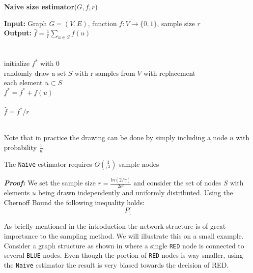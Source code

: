 \begin{algorithm*}[!htb]
  \caption{\small {\bf Naive size estimator}($G, f, r$)}
  \begin{code}
  {\bf Input:} Graph $G=(V,E)$, function $f : V \rightarrow \{0,1\}$, sample size $r$ \\
  {\bf Output:} $\hat{f}=\frac{1}{r}\sum\nolimits_{u\in S} f(u)$\\
  \\
  \uln \>\ubegin\\
  \uln \>\>initialize $f^*$ with 0 \\
  \uln \>\>randomly draw a set $S$ with r samples from $V$ with replacement\\
  \uln \>\>\ufor each element $u \subset S$ \udo\\
  \uln \>\>\>$f^* = f^* + f(u)$ \\
  \uln \>\>\uend\\
  \uln \>\ureturn $\hat{f} = f^*/r$ \\
  \uln \>\uend\\ 
  \end{code}
  \label{alg:main}
\end{algorithm*}
Note that in practice the drawing can be done by simply including a node $u$ with probability $\frac{1}{n}$.
\begin{theorem}
  The \texttt{Naive} estimator requires $O(\frac{1}{\epsilon^2})$ sample nodes
\end{theorem}
\textbf{\textit{Proof: }}We set the sample size $r = \frac{ln(2/\gamma)}{2\epsilon^2}$ and consider the set of nodes $S$ with elements $u$ being drawn independently and uniformly distributed.
Using the Chernoff Bound the following inequality holds:
$$P[$$ 

As briefly mentioned in the introduction the network structure is of great importance to the sampling method.
We will illustrate this on a small example. Consider a graph structure as shown in  where a single \texttt{RED} node is connected to several \texttt{BLUE} nodes.
Even though the portion of \texttt{RED} nodes is way smaller, using the \texttt{Naive} estimator the result is very biased towards the decision of {RED}.

